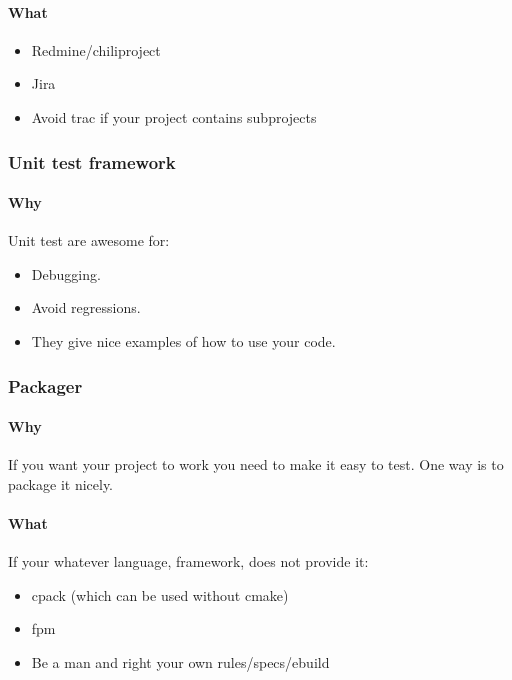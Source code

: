 \documentclass[a4paper, 12pt, twoside, openright]{article}
\begin{document}
  \paragraph{What}
  \begin{itemize}
    \item Redmine/chiliproject
    \item Jira
    \item Avoid trac if your project contains subprojects
  \end{itemize}


  \subsubsection{Unit test framework}
  \paragraph{Why}

  Unit test are awesome for:
  \begin{itemize}
    \item Debugging.
    \item Avoid regressions.
    \item They give nice examples of how to use your code.
  \end{itemize}
  

  \subsubsection{Packager}

  \paragraph{Why}

  If you want your project to work you need to make it easy to test. 
  One way is to package it nicely. 

  \paragraph{What}
  If your whatever language, framework, does not provide it:
  \begin{itemize}
    \item cpack (which can be used without cmake)
    \item fpm
    \item Be a man and right your own rules/specs/ebuild
  \end{itemize}
\end{document}
